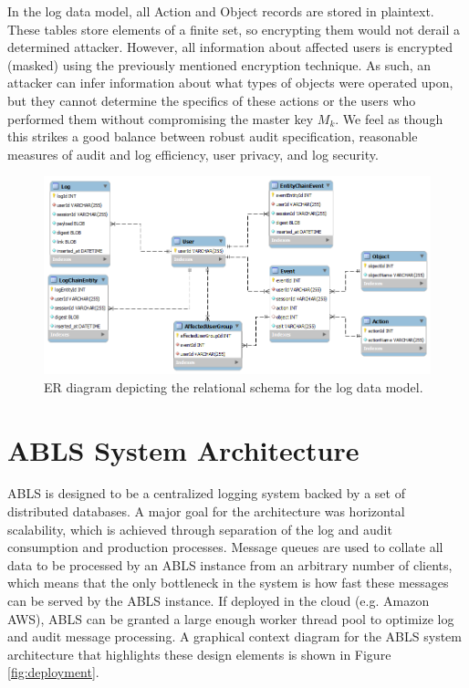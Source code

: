 \documentclass{sig-alternate}
\begin{document}
In the log data model, all Action and Object records are stored in plaintext. These tables store elements of a finite set, so
encrypting them would not derail a determined attacker. However, all information about affected users is encrypted 
(masked) using the previously mentioned encryption technique. As such, an attacker can infer
information about what types of objects were operated upon, but they cannot determine the specifics of these actions
or the users who performed them without compromising the master key $M_k$. We feel as though this strikes
a good balance between robust audit specification, reasonable measures of audit and log efficiency, user privacy, and log security. 

\begin{figure}[htb!]
\begin{center}
\includegraphics[width=5in]{images/logSchema.png}
\caption{ER diagram depicting the relational schema for the log data model.}
\label{fig:schema}
\end{center}
\end{figure}

\section{ABLS System Architecture}
\label{sec:deployment}
ABLS is designed to be a centralized logging system backed by a set of distributed databases. A major
goal for the architecture was horizontal scalability, which is achieved through separation of the log and 
audit consumption and production processes. Message queues are used to collate all data to be processed
by an ABLS instance from an arbitrary number of clients, which means that the only bottleneck in the system is how
fast these messages can be served by the ABLS instance. If deployed in the cloud (e.g. Amazon AWS), ABLS can 
be granted a large enough worker thread pool to optimize log and audit message processing. A graphical context
diagram for the ABLS system architecture that highlights these design elements is shown in Figure \ref{fig:deployment}.
\end{document}
